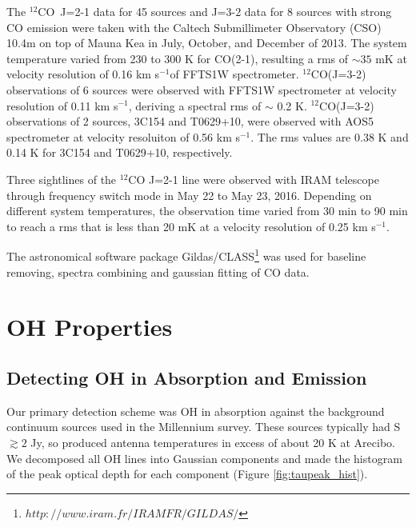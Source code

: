 \documentclass[preprint]{emulateapj}
\def\kms{km s$^{-1}$}
\def\co{$^{12}$CO}
\begin{document}
	The \co\  J=2-1 data for 45 sources and J=3-2 data for 8 sources with strong CO emission were taken with the  Caltech Submillimeter Observatory (CSO) 10.4m on top of Mauna Kea in July, October, and December of 2013.  The system temperature varied from 230 to 300 K for CO(2-1), resulting a rms of $\sim 35$ mK at velocity resolution of 0.16 \kms of FFTS1W spectrometer.   $^{12}$CO(J=3-2) observations of  6 sources were observed with FFTS1W spectrometer at velocity resolution of 0.11 \kms, deriving a spectral rms of $\sim$ 0.2 K.  $^{12}$CO(J=3-2) observations of  2 sources, 3C154 and T0629+10, were observed  with AOS5 spectrometer at velocity resoluiton of  0.56 \kms. The rms values are 0.38 K and 0.14 K for 3C154 and T0629+10, respectively.
	
	Three sightlines of the $^{12}$CO J=2-1 line were observed with IRAM telescope through frequency switch mode in May 22 to May 23, 2016.  Depending on different system temperatures, the observation time varied from  30 min to 90 min to reach a rms that is less than 20 mK at a velocity resolution of 0.25 \kms.
	
	The astronomical software package Gildas/CLASS\footnote{$http://www.iram.fr/IRAMFR/GILDAS/$} was used for baseline removing, spectra combining and gaussian fitting of CO data. 

\section{OH Properties}
\label{sec:oh_properties}

\subsection{Detecting OH in Absorption and Emission}
\label{sec:oh_emi_abs}

Our primary detection scheme was OH in absorption against the background continuum sources used in the Millennium survey. These sources typically had S $\gtrsim 2$ Jy, so produced antenna temperatures in excess of about 20 K at Arecibo. We decomposed all OH lines into Gaussian components and made the histogram of the peak optical depth for each component (Figure \ref{fig:taupeak_hist}). 
\end{document}
